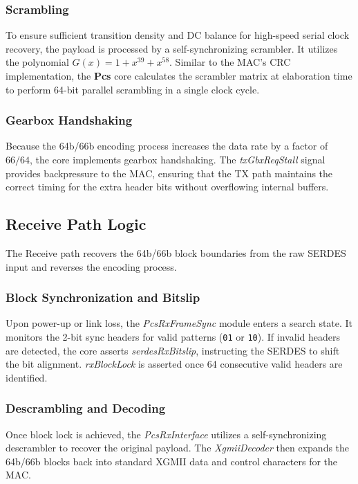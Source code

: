 \subsubsection{Scrambling}
To ensure sufficient transition density and DC balance for high-speed serial clock recovery, the payload is processed by a self-synchronizing scrambler. It utilizes the polynomial $G(x) = 1 + x^{39} + x^{58}$. Similar to the MAC's CRC implementation, the \textbf{Pcs} core calculates the scrambler matrix at elaboration time to perform 64-bit parallel scrambling in a single clock cycle.

\subsubsection{Gearbox Handshaking}
Because the 64b/66b encoding process increases the data rate by a factor of $66/64$, the core implements gearbox handshaking. The \textit{txGbxReqStall} signal provides backpressure to the MAC, ensuring that the TX path maintains the correct timing for the extra header bits without overflowing internal buffers.

\subsection{Receive Path Logic}
The Receive path recovers the 64b/66b block boundaries from the raw SERDES input and reverses the encoding process.

\subsubsection{Block Synchronization and Bitslip}
Upon power-up or link loss, the \textit{PcsRxFrameSync} module enters a search state. It monitors the 2-bit sync headers for valid patterns (\texttt{01} or \texttt{10}). If invalid headers are detected, the core asserts \textit{serdesRxBitslip}, instructing the SERDES to shift the bit alignment. \textit{rxBlockLock} is asserted once 64 consecutive valid headers are identified.

\subsubsection{Descrambling and Decoding}
Once block lock is achieved, the \textit{PcsRxInterface} utilizes a self-synchronizing descrambler to recover the original payload. The \textit{XgmiiDecoder} then expands the 64b/66b blocks back into standard XGMII data and control characters for the MAC.

